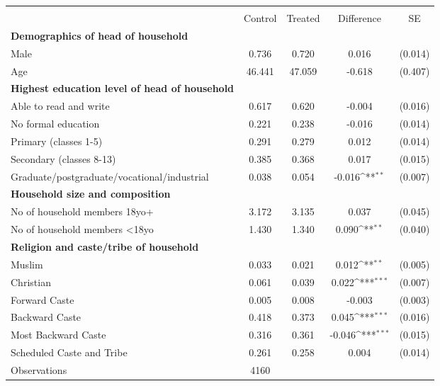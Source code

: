 {
\def\sym#1{\ifmmode^{#1}\else\(^{#1}\)\fi}
\begin{tabular}{l*{1}{cccc}}
\hline\hline
                    &\multicolumn{4}{c}{}                                        \\
                    &     Control&     Treated&  Difference         &          SE\\
\hline
\textbf{Demographics of head of household}&            &            &                     &            \\
Male                &       0.736&       0.720&       0.016         &     (0.014)\\
Age                 &      46.441&      47.059&      -0.618         &     (0.407)\\
\textbf{Highest education level of head of household}&            &            &                     &            \\
Able to read and write&       0.617&       0.620&      -0.004         &     (0.016)\\
No formal education &       0.221&       0.238&      -0.016         &     (0.014)\\
Primary (classes 1-5)&       0.291&       0.279&       0.012         &     (0.014)\\
Secondary (classes 8-13)&       0.385&       0.368&       0.017         &     (0.015)\\
Graduate/postgraduate/vocational/industrial&       0.038&       0.054&      -0.016\sym{**} &     (0.007)\\
\textbf{Household size and composition}&            &            &                     &            \\
No of household members 18yo+&       3.172&       3.135&       0.037         &     (0.045)\\
No of household members \textless{}18yo&       1.430&       1.340&       0.090\sym{**} &     (0.040)\\
\textbf{Religion and caste/tribe of household}&            &            &                     &            \\
Muslim              &       0.033&       0.021&       0.012\sym{**} &     (0.005)\\
Christian           &       0.061&       0.039&       0.022\sym{***}&     (0.007)\\
Forward Caste       &       0.005&       0.008&      -0.003         &     (0.003)\\
Backward Caste      &       0.418&       0.373&       0.045\sym{***}&     (0.016)\\
Most Backward Caste &       0.316&       0.361&      -0.046\sym{***}&     (0.015)\\
Scheduled Caste and Tribe&       0.261&       0.258&       0.004         &     (0.014)\\
\hline
Observations        &        4160&            &                     &            \\
\hline\hline
\end{tabular}
}
